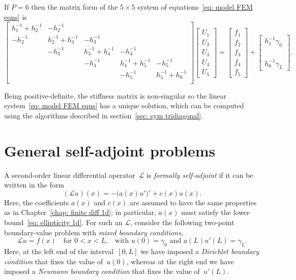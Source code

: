 \begin{example}
If $P=6$ then the matrix form of the $5\times 5$ system of 
equations~\eqref{eq: model FEM eqns} is
\[
\begin{bmatrix}
 h_1^{-1}+h_2^{-1}&        -h_2^{-1}&&&\\
         -h_2^{-1}&h_2^{-1}+h_3^{-1}&-h_3^{-1}&&\\
        &-h_3^{-1}&h_3^{-1}+h_4^{-1}&-h_4^{-1}&\\
       &&-h_4^{-1}&h_4^{-1}+h_5^{-1}&-h_5^{-1}\\
      &&&-h_5^{-1}&h_5^{-1}+h_6^{-1}\\
\end{bmatrix}
\begin{bmatrix}U_1\\ U_2\\ U_3\\ U_4\\ U_5\end{bmatrix}
=\begin{bmatrix}f_1\\ f_2\\ f_3\\ f_4\\ f_5\end{bmatrix}
+\begin{bmatrix}h_1^{-1}\gamma_0\\ \\ \\ \\ h_6^{-1}\gamma_L\end{bmatrix}.
\]
\end{example}

Being positive-definite, the stiffness matrix is non-singular so the linear 
system~\eqref{eq: model FEM eqns} has a unique solution, which can be 
computed using the algorithms described in section~\ref{sec: sym tridiagonal}.

\section{General self-adjoint problems}\label{sec: self-adjoint 1d}
A second-order linear differential operator~$\mathcal{L}$ is 
\emph{formally self-adjoint} if it can be written in the form
\begin{equation}\label{eq: L self-adjoint}
(\mathcal{L}u)(x)=-\bigl(a(x)u'\bigr)'+c(x)u(x).
\end{equation}
Here, the coefficients $a(x)$ and $c(x)$ are assumed to have the same 
properties as in Chapter~\ref{chap: finite diff 1d}; in particular, $a(x)$ must 
satisfy the lower bound~\eqref{eq: ellipticity 1d}. For such an $\mathcal{L}$, 
consider the following two-point boundary-value problem with \emph{mixed 
boundary conditions},
\begin{equation}\label{eq: self-adjoint mixed}
\mathcal{L}u=f(x)\quad\text{for $0<x<L$,}\quad
\text{with $u(0)=\gamma_0$ and $a(L)u'(L)=\gamma_L$.}
\end{equation}
Here, at the left end of the interval~$[0,L]$ we have imposed a
\emph{Dirichlet boundary condition} that fixes the value of~$u(0)$, whereas
at the right end we have imposed a \emph{Neumann boundary condition} that
fixes the value of~$u'(L)$.

